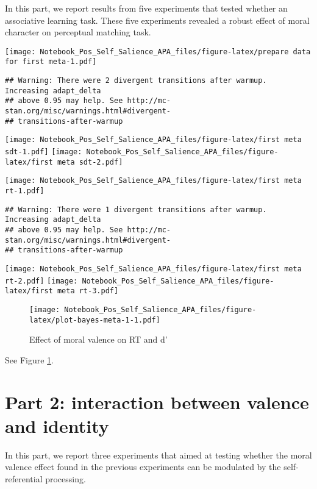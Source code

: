 \documentclass[
  english,
  man]{apa6}
\begin{document}
In this part, we report results from five experiments that tested whether an associative learning task. These five experiments revealed a robust effect of moral character on perceptual matching task.

\texttt{[image: Notebook\_Pos\_Self\_Salience\_APA\_files/figure-latex/prepare data for first meta-1.pdf]}

\begin{verbatim}
## Warning: There were 2 divergent transitions after warmup. Increasing adapt_delta
## above 0.95 may help. See http://mc-stan.org/misc/warnings.html#divergent-
## transitions-after-warmup
\end{verbatim}

\texttt{[image: Notebook\_Pos\_Self\_Salience\_APA\_files/figure-latex/first meta sdt-1.pdf]} \texttt{[image: Notebook\_Pos\_Self\_Salience\_APA\_files/figure-latex/first meta sdt-2.pdf]}

\texttt{[image: Notebook\_Pos\_Self\_Salience\_APA\_files/figure-latex/first meta rt-1.pdf]}

\begin{verbatim}
## Warning: There were 1 divergent transitions after warmup. Increasing adapt_delta
## above 0.95 may help. See http://mc-stan.org/misc/warnings.html#divergent-
## transitions-after-warmup
\end{verbatim}

\texttt{[image: Notebook\_Pos\_Self\_Salience\_APA\_files/figure-latex/first meta rt-2.pdf]} \texttt{[image: Notebook\_Pos\_Self\_Salience\_APA\_files/figure-latex/first meta rt-3.pdf]}

\begin{figure}
\centering
\texttt{[image: Notebook\_Pos\_Self\_Salience\_APA\_files/figure-latex/plot-bayes-meta-1-1.pdf]}
\caption{\label{fig:plot-bayes-meta-1}Effect of moral valence on RT and d'}
\end{figure}

See Figure \ref{fig:plot-bayes-meta-1}.

\hypertarget{part-2-interaction-between-valence-and-identity}{%
\section{Part 2: interaction between valence and identity}\label{part-2-interaction-between-valence-and-identity}}

In this part, we report three experiments that aimed at testing whether the moral valence effect found in the previous experiments can be modulated by the self-referential processing.
\end{document}
